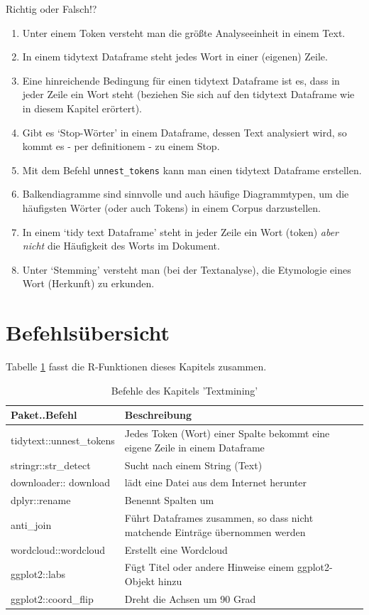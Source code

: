 \documentclass[12pt,ngerman,]{book}
\providecommand{\tightlist}{%
  \setlength{\itemsep}{0pt}\setlength{\parskip}{0pt}}
\theoremstyle{definition}
\theoremstyle{definition}
\theoremstyle{remark}
\let\BeginKnitrBlock\begin \let\EndKnitrBlock\end
\begin{document}
\BeginKnitrBlock{rmdexercises}
Richtig oder Falsch!?

\begin{enumerate}
\def\labelenumi{\arabic{enumi}.}
\tightlist
\item
  Unter einem Token versteht man die größte Analyseeinheit in einem
  Text.
\item
  In einem tidytext Dataframe steht jedes Wort in einer (eigenen) Zeile.
\item
  Eine hinreichende Bedingung für einen tidytext Dataframe ist es, dass
  in jeder Zeile ein Wort steht (beziehen Sie sich auf den tidytext
  Dataframe wie in diesem Kapitel erörtert).
\item
  Gibt es `Stop-Wörter' in einem Dataframe, dessen Text analysiert wird,
  so kommt es - per definitionem - zu einem Stop.
\item
  Mit dem Befehl \texttt{unnest\_tokens} kann man einen tidytext
  Dataframe erstellen.
\item
  Balkendiagramme sind sinnvolle und auch häufige Diagrammtypen, um die
  häufigsten Wörter (oder auch Tokens) in einem Corpus darzustellen.
\item
  In einem `tidy text Dataframe' steht in jeder Zeile ein Wort (token)
  \emph{aber nicht} die Häufigkeit des Worts im Dokument.
\item
  Unter `Stemming' versteht man (bei der Textanalyse), die Etymologie
  eines Wort (Herkunft) zu erkunden.
\end{enumerate}
\EndKnitrBlock{rmdexercises}

\section{Befehlsübersicht}\label{befehlsubersicht-11}

Tabelle \ref{tab:befehle-text} fasst die R-Funktionen dieses Kapitels
zusammen.

\begin{table}

\caption{\label{tab:befehle-text}Befehle des Kapitels 'Textmining'}
\centering
\begin{tabular}[t]{l|l}
\hline
Paket..Befehl & Beschreibung\\
\hline
tidytext::unnest\_tokens & Jedes Token (Wort) einer Spalte bekommt eine eigene Zeile in einem Dataframe\\
\hline
stringr::str\_detect & Sucht nach einem String (Text)\\
\hline
downloader:: download & lädt eine Datei aus dem Internet herunter\\
\hline
dplyr::rename & Benennt Spalten um\\
\hline
anti\_join & Führt Dataframes zusammen, so dass nicht matchende Einträge übernommen werden\\
\hline
wordcloud::wordcloud & Erstellt eine Wordcloud\\
\hline
ggplot2::labs & Fügt Titel oder andere Hinweise einem ggplot2-Objekt hinzu\\
\hline
ggplot2::coord\_flip & Dreht die Achsen um 90 Grad\\
\hline
\end{tabular}
\end{table}
\end{document}

